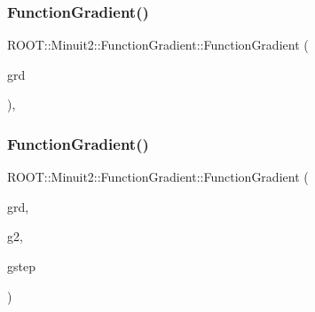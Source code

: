 \mbox{\label{classROOT_1_1Minuit2_1_1FunctionGradient_afa8994fbd866150bd14ab53a2919c7bf}} 
\subsubsection{\texorpdfstring{FunctionGradient()}{FunctionGradient()}\hspace{0.1cm}{\footnotesize\ttfamily [2/8]}}
{\footnotesize\ttfamily R\+O\+O\+T\+::\+Minuit2\+::\+Function\+Gradient\+::\+Function\+Gradient (\begin{DoxyParamCaption}\item[{const \mbox{\hyperlink{namespaceROOT_1_1Minuit2_a62ed97730a1ca8d3fbaec64a19aa11c9}{Mn\+Algebraic\+Vector}} \&}]{grd }\end{DoxyParamCaption})\hspace{0.3cm}{\ttfamily [inline]}, {\ttfamily [explicit]}}

\mbox{\label{classROOT_1_1Minuit2_1_1FunctionGradient_ac9d34f0e3e55ec0e9d5e8a8bd3678b79}} 
\subsubsection{\texorpdfstring{FunctionGradient()}{FunctionGradient()}\hspace{0.1cm}{\footnotesize\ttfamily [3/8]}}
{\footnotesize\ttfamily R\+O\+O\+T\+::\+Minuit2\+::\+Function\+Gradient\+::\+Function\+Gradient (\begin{DoxyParamCaption}\item[{const \mbox{\hyperlink{namespaceROOT_1_1Minuit2_a62ed97730a1ca8d3fbaec64a19aa11c9}{Mn\+Algebraic\+Vector}} \&}]{grd,  }\item[{const \mbox{\hyperlink{namespaceROOT_1_1Minuit2_a62ed97730a1ca8d3fbaec64a19aa11c9}{Mn\+Algebraic\+Vector}} \&}]{g2,  }\item[{const \mbox{\hyperlink{namespaceROOT_1_1Minuit2_a62ed97730a1ca8d3fbaec64a19aa11c9}{Mn\+Algebraic\+Vector}} \&}]{gstep }\end{DoxyParamCaption})\hspace{0.3cm}{\ttfamily [inline]}}

